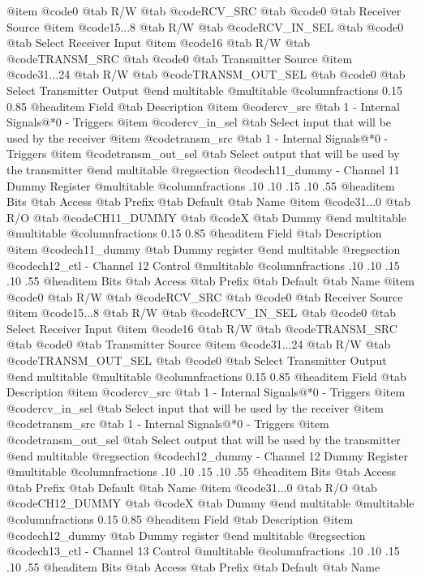 @item @code{0}
@tab R/W @tab
@code{RCV_SRC}
@tab @code{0} @tab 
Receiver Source
@item @code{15...8}
@tab R/W @tab
@code{RCV_IN_SEL}
@tab @code{0} @tab 
Select Receiver Input
@item @code{16}
@tab R/W @tab
@code{TRANSM_SRC}
@tab @code{0} @tab 
Transmitter Source
@item @code{31...24}
@tab R/W @tab
@code{TRANSM_OUT_SEL}
@tab @code{0} @tab 
Select Transmitter Output
@end multitable
@multitable @columnfractions 0.15 0.85
@headitem Field @tab Description
@item @code{rcv_src} @tab 1 - Internal Signals@*0 - Triggers
@item @code{rcv_in_sel} @tab Select input that will be used by the receiver
@item @code{transm_src} @tab 1 - Internal Signals@*0 - Triggers
@item @code{transm_out_sel} @tab Select output that will be used by the transmitter
@end multitable
@regsection @code{ch11_dummy} - Channel 11 Dummy Register
@multitable @columnfractions .10 .10 .15 .10 .55
@headitem Bits @tab Access @tab Prefix @tab Default @tab Name
@item @code{31...0}
@tab R/O @tab
@code{CH11_DUMMY}
@tab @code{X} @tab 
Dummy
@end multitable
@multitable @columnfractions 0.15 0.85
@headitem Field @tab Description
@item @code{ch11_dummy} @tab Dummy register
@end multitable
@regsection @code{ch12_ctl} - Channel 12 Control
@multitable @columnfractions .10 .10 .15 .10 .55
@headitem Bits @tab Access @tab Prefix @tab Default @tab Name
@item @code{0}
@tab R/W @tab
@code{RCV_SRC}
@tab @code{0} @tab 
Receiver Source
@item @code{15...8}
@tab R/W @tab
@code{RCV_IN_SEL}
@tab @code{0} @tab 
Select Receiver Input
@item @code{16}
@tab R/W @tab
@code{TRANSM_SRC}
@tab @code{0} @tab 
Transmitter Source
@item @code{31...24}
@tab R/W @tab
@code{TRANSM_OUT_SEL}
@tab @code{0} @tab 
Select Transmitter Output
@end multitable
@multitable @columnfractions 0.15 0.85
@headitem Field @tab Description
@item @code{rcv_src} @tab 1 - Internal Signals@*0 - Triggers
@item @code{rcv_in_sel} @tab Select input that will be used by the receiver
@item @code{transm_src} @tab 1 - Internal Signals@*0 - Triggers
@item @code{transm_out_sel} @tab Select output that will be used by the transmitter
@end multitable
@regsection @code{ch12_dummy} - Channel 12 Dummy Register
@multitable @columnfractions .10 .10 .15 .10 .55
@headitem Bits @tab Access @tab Prefix @tab Default @tab Name
@item @code{31...0}
@tab R/O @tab
@code{CH12_DUMMY}
@tab @code{X} @tab 
Dummy
@end multitable
@multitable @columnfractions 0.15 0.85
@headitem Field @tab Description
@item @code{ch12_dummy} @tab Dummy register
@end multitable
@regsection @code{ch13_ctl} - Channel 13 Control
@multitable @columnfractions .10 .10 .15 .10 .55
@headitem Bits @tab Access @tab Prefix @tab Default @tab Name
